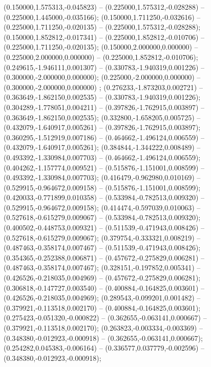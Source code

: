 (0.150000,1.575313,-0.045823) -- (0.225000,1.575312,-0.028288) -- (0.225000,1.445000,-0.035166);
 (0.150000,1.711250,-0.032616) -- (0.225000,1.711250,-0.020135) -- (0.225000,1.575312,-0.028288);
 (0.150000,1.852812,-0.017341) -- (0.225000,1.852812,-0.010706) -- (0.225000,1.711250,-0.020135);
 (0.150000,2.000000,0.000000) -- (0.225000,2.000000,0.000000) -- (0.225000,1.852812,-0.010706);
 (0.249615,-1.946111,0.001307) -- (0.330783,-1.940319,0.001226) -- (0.300000,-2.000000,0.000000);
 (0.225000,-2.000000,0.000000) -- (0.300000,-2.000000,0.000000) ;
 (0.276233,-1.873203,0.002721) -- (0.363649,-1.862150,0.002535) -- (0.330783,-1.940319,0.001226);
 (0.304289,-1.778051,0.004211) -- (0.397826,-1.762915,0.003897) -- (0.363649,-1.862150,0.002535);
 (0.332800,-1.658205,0.005725) -- (0.432079,-1.640917,0.005261) -- (0.397826,-1.762915,0.003897);
 (0.360295,-1.512919,0.007186) -- (0.464662,-1.496124,0.006559) -- (0.432079,-1.640917,0.005261);
 (0.384844,-1.344222,0.008489) -- (0.493392,-1.330984,0.007703) -- (0.464662,-1.496124,0.006559);
 (0.404262,-1.157774,0.009521) -- (0.515876,-1.151001,0.008599) -- (0.493392,-1.330984,0.007703);
 (0.416479,-0.962980,0.010169) -- (0.529915,-0.964672,0.009158) -- (0.515876,-1.151001,0.008599);
 (0.420033,-0.771899,0.010358) -- (0.533984,-0.782513,0.009320) -- (0.529915,-0.964672,0.009158);
 (0.414474,-0.597039,0.010063) -- (0.527618,-0.615279,0.009067) -- (0.533984,-0.782513,0.009320);
 (0.400502,-0.448753,0.009321) -- (0.511539,-0.471943,0.008426) -- (0.527618,-0.615279,0.009067);
 (0.379754,-0.333321,0.008219) -- (0.487463,-0.358174,0.007467) -- (0.511539,-0.471943,0.008426);
 (0.354365,-0.252388,0.006871) -- (0.457672,-0.275829,0.006281) -- (0.487463,-0.358174,0.007467);
 (0.328151,-0.197852,0.005341) -- (0.426526,-0.218035,0.004969) -- (0.457672,-0.275829,0.006281);
 (0.306818,-0.147727,0.003540) -- (0.400884,-0.164825,0.003601) -- (0.426526,-0.218035,0.004969);
 (0.289543,-0.099201,0.001482) -- (0.379921,-0.113518,0.002170) -- (0.400884,-0.164825,0.003601);
 (0.275423,-0.051320,-0.000822) -- (0.362655,-0.063141,0.000667) -- (0.379921,-0.113518,0.002170);
 (0.263823,-0.003334,-0.003369) -- (0.348380,-0.012923,-0.000918) -- (0.362655,-0.063141,0.000667);
 (0.254282,0.045383,-0.006164) -- (0.336577,0.037779,-0.002596) -- (0.348380,-0.012923,-0.000918);
